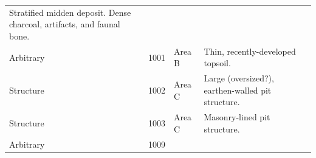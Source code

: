 \documentclass[
  12pt,
]{krantz}
\begin{document}
\begin{longtable}[]{@{}llll@{}}
\begin{minipage}[t]{0.38\columnwidth}
Stratified midden deposit.
Dense charcoal, artifacts,
and faunal bone.\strut
\end{minipage}\tabularnewline
\begin{minipage}[t]{0.18\columnwidth}\raggedright
Arbitrary\strut
\end{minipage} & \begin{minipage}[t]{0.11\columnwidth}\raggedright
1001\strut
\end{minipage} & \begin{minipage}[t]{0.16\columnwidth}\raggedright
Area B\strut
\end{minipage} & \begin{minipage}[t]{0.38\columnwidth}\raggedright
Thin, recently-developed
topsoil.\strut
\end{minipage}\tabularnewline
\begin{minipage}[t]{0.18\columnwidth}\raggedright
Structure\strut
\end{minipage} & \begin{minipage}[t]{0.11\columnwidth}\raggedright
1002\strut
\end{minipage} & \begin{minipage}[t]{0.16\columnwidth}\raggedright
Area C\strut
\end{minipage} & \begin{minipage}[t]{0.38\columnwidth}\raggedright
Large (oversized?),
earthen-walled pit
structure.\strut
\end{minipage}\tabularnewline
\begin{minipage}[t]{0.18\columnwidth}\raggedright
Structure\strut
\end{minipage} & \begin{minipage}[t]{0.11\columnwidth}\raggedright
1003\strut
\end{minipage} & \begin{minipage}[t]{0.16\columnwidth}\raggedright
Area C\strut
\end{minipage} & \begin{minipage}[t]{0.38\columnwidth}\raggedright
Masonry-lined pit structure.\strut
\end{minipage}\tabularnewline
\begin{minipage}[t]{0.18\columnwidth}\raggedright
Arbitrary\strut
\end{minipage} & \begin{minipage}[t]{0.11\columnwidth}\raggedright
1009\strut
\end{minipage} & \begin{minipage}[t]{0.16\columnwidth}\raggedright

\end{minipage}
\end{longtable}
\end{document}
